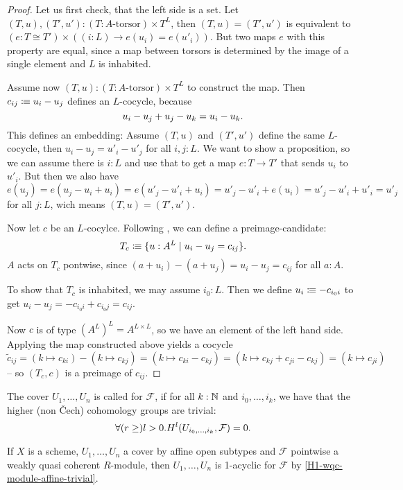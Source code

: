 \begin{proof}
  Let us first check, that the left side is a set.
  Let $(T,u),(T',u'):(T:\text{$A$-torsor})\times T^L$,
  then $(T,u)=(T',u')$ is equivalent to $(e:T\cong T')\times ((i:L)\to e(u_i)=e(u'_i))$.
  But two maps $e$ with this property are equal,
  since a map between torsors is determined by the image of a single element and $L$ is inhabited.
  
  Assume now $(T,u):(T:\text{$A$-torsor})\times T^L$ to construct the map.
  Then $c_{ij}\vcentcolon\mspace{-1.2mu}\equiv u_i-u_j$ defines an $L$-cocycle,
  because
  \[
    u_i-u_j + u_j-u_k = u_i-u_k
    \rlap{.}
  \]
  This defines an embedding: Assume $(T,u)$ and $(T',u')$ define the same $L$-cocycle,
  then $u_i-u_j=u'_i-u'_j$ for all $i,j:L$.
  We want to show a proposition, so we can assume there is $i:L$ and use that to get a map $e:T\to T'$
  that sends $u_i$ to $u'_i$.
  But then we also have
  \[
    e(u_j)=e(u_j-u_i+u_i)=e(u'_j-u'_i+u_i)=u'_j-u'_i+e(u_i)=u'_j-u'_i+u'_i=u'_j
  \]
  for all $j:L$, wich means $(T,u)=(T',u')$.
    
  Now let $c$ be an $L$-cocylce.
  Following \cite{Deligne91}, we can define a preimage-candidate:
  \[
    T_c\colonequiv \{u:A^L\mid u_i-u_j=c_{ij}\}
    \rlap{.}
  \]
  $A$ acts on $T_c$ pontwise, since $(a+u_i)-(a+u_j)=u_i-u_j=c_{ij}$ for all $a:A$.
  
  To show that $T_c$ is inhabited,
  we may assume $i_0:L$.
  Then we define $u_i\vcentcolon\mspace{-1.2mu}\equiv -c_{i_0i}$ to get $u_i-u_j=-c_{i_0i}+c_{i_0j}=c_{ij}$.

  Now $c$ is of type $(A^L)^L=A^{L\times L}$, so we have an element of the left hand side.
  Applying the map constructed above yields a cocycle
  \[
    \tilde{c}_{ij}=(k\mapsto c_{ki})-(k\mapsto c_{kj})=(k\mapsto c_{ki}-c_{kj})=(k\mapsto c_{kj}+c_{ji}-c_{kj})=(k\mapsto c_{ji})
  \]
  -- so $(T_c,c)$ is a preimage of $c_{ij}$.
\end{proof}

\begin{definition}
  The cover $U_1,\dots,U_n$ is called  for $\mathcal F$,
  if for all $k:\mathbb{N}$ and $i_0,\dots,i_k$, we have that the higher (non Čech) cohomology groups are trivial:
  \[
    \forall (r\geq)l>0. H^l(U_{i_0,\dots,i_k},\mathcal F)=0\rlap{.}
  \]
\end{definition}

\begin{example}
  If $X$ is a scheme, $U_1,\dots,U_n$ a cover by affine open subtypes
  and $\mathcal F$ pointwise a weakly quasi coherent $R$-module,
  then $U_1,\dots,U_n$ is 1-acyclic for $\mathcal F$ by \cref{H1-wqc-module-affine-trivial}.
\end{example}

